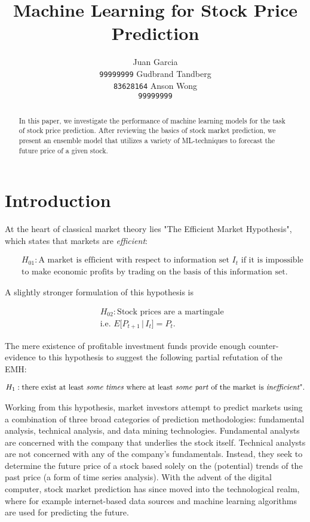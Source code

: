 \documentclass{article}
\title{Machine Learning for Stock Price Prediction}
\author{
 Juan Garcia\\
 \texttt{99999999}
 \And
 Gudbrand Tandberg \\
\texttt{83628164}
 \And
 Anson Wong\\
 \texttt{99999999}
 }
\begin{document}
\maketitle

\begin{abstract}
In this paper, we investigate the performance of machine learning models for the task of stock price prediction. After reviewing the basics of stock market prediction, we present an ensemble model that utilizes a variety of ML-techniques to forecast the future price of a given stock.
\end{abstract}

\section{Introduction}
At the heart of classical market theory lies "The Efficient Market Hypothesis", which states that markets are \emph{efficient}:

\begin{eqnarray*}
&&H_{01}: \text{A market is efficient with respect to information set $I_t$ if it is impossible}\\
&&\text{to make economic profits by trading on the basis of this information set.}
\end{eqnarray*}

A slightly stronger formulation of this hypothesis is 

\begin{eqnarray*}
&&H_{02}: \text{Stock prices are a martingale}\\
&&\text{i.e. } E\lbrack P_{t+1} \,|\, I_t\rbrack = P_t.
\end{eqnarray*}

The mere existence of profitable investment funds provide enough counter-evidence to this hypothesis to suggest the following partial refutation of the EMH: 

\begin{eqnarray*}
H_{1}: \text{there exist at least \emph{some times} where at least \emph{some part} of the market is \emph{inefficient}".}
\end{eqnarray*}

Working from this hypothesis, market investors attempt to predict markets using a combination of three broad categories of prediction methodologies: fundamental analysis, technical analysis, and data mining technologies. Fundamental analysts are concerned with the company that underlies the stock itself. Technical analysts are not concerned with any of the company's fundamentals. Instead, they seek to determine the future price of a stock based solely on the (potential) trends of the past price (a form of time series analysis). With the advent of the digital computer, stock market prediction has since moved into the technological realm, where for example internet-based data sources and machine learning algorithms are used for predicting the future. 
\end{document}
